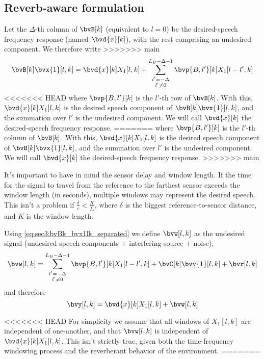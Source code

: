 \subsection{Reverb-aware formulation}
Let the $\Delta$-th column of $\bvB[k]$ (equivalent to $l=0$) be the desired-speech frequency response (named $\bvd{x}[k]$), with the rest comprising an undesired component. We therefore write
>>>>>>> main
\begin{equation}
	\label{eq:sec3:bvBk_bvx1lk_separated}
	\bvB[k] \bvx{1}[l,k] = \bvd{x}[k] X_1[l,k] + \sum_{\substack{l'=-\Delta \\ l' \neq 0}}^{L_B-\Delta-1} \bvp{B,l'}[k] X_1[l-l',k]
\end{equation}
<<<<<<< HEAD
where $\bvp{B,l'}[k]$ is the $l'$-th row of $\bvB[k]$. With this, $\bvd{x}[k] X_1[l,k]$ is the desired speech component of $\bvB[k] \bvx{1}[l,k]$, and the summation over $l'$ is the undesired component. We will call $\bvd{x}[k]$ the desired-speech frequency response.
=======
where $\bvp{B,l'}[k]$ is the $l'$-th column of $\bvB[k]$. With this, $\bvd{x}[k] X_1[l,k]$ is the desired speech component of $\bvB[k] \bvx{1}[l,k]$, and the summation over $l'$ is the undesired component. We will call $\bvd{x}[k]$ the desired-speech frequency response.
>>>>>>> main

It's important to have in mind the sensor delay and window length. If the time for the signal to travel from the reference to the farthest sensor exceeds the window length (in seconds), multiple windows may represent the desired speech. This isn't a problem if $\frac{\delta}{c} < \frac{K}{f_s}$, where $\delta$ is the biggest reference-to-sensor distance, and $K$ is the window length.

Using \cref{eq:sec3:bvBk_bvx1lk_separated} we define $\bvw[l,k]$ as the undesired signal (undesired speech components + interfering source + noise),
\begin{equation}
	\label{eq:sec3:def_undes_sig_bvwlk}
	\bvw[l,k] = \sum_{\substack{l'=-\Delta \\ l' \neq 0}}^{L_B-\Delta-1} \bvp{B,l'}[k] X_1[l-l',k] + \bvC[k] \bvv{1}[l,k] + \bvr[l,k]
\end{equation}
and therefore
\begin{equation}
    \label{eq:sec3:time-freq_model_final}
	\bvy[l,k] = \bvd{x}[k] X_1[l,k] + \bvw[l,k]
\end{equation}

<<<<<<< HEAD
For simplicity we assume that all windows of $X_{1}[l,k]$ are independent of one-another, and that $\bvw[l,k]$ is independent of  $\bvd{x}[k] X_1[l,k]$. This isn't strictly true, given both the time-frequency windowing process and the reverberant behavior of the environment.
=======

